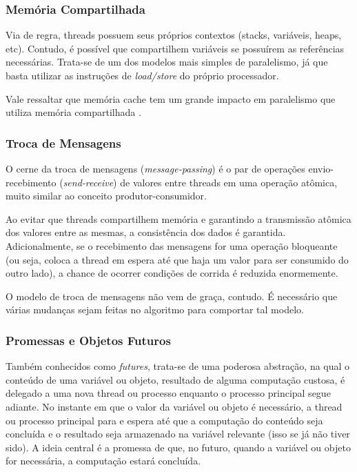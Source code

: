 \documentclass[12pt,a4paper]{article}
\begin{document}
\subsubsection{Memória Compartilhada}
\label{sssec:memoria compartilhada}

Via de regra, threads possuem seus próprios contextos (stacks, variáveis, heaps, etc). Contudo, é possível que compartilhem variáveis se possuírem as referências necessárias. Trata-se de um dos modelos mais simples de paralelismo, já que basta utilizar as instruções de \emph{load/store} do próprio processador.

Vale ressaltar que memória cache tem um grande impacto em paralelismo que utiliza memória compartilhada \cite{pacheco11}.

\subsubsection{Troca de Mensagens}
\label{sssec:troca mensagens}

O cerne da troca de mensagens (\emph{message-passing}) é o par de operações envio-recebimento ({\it send-receive}) de valores entre threads em uma operação atômica, muito similar ao conceito produtor-consumidor.

Ao evitar que threads compartilhem memória e garantindo a transmissão atômica dos valores entre as mesmas, a consistência dos dados é garantida. Adicionalmente, se o recebimento das mensagens for uma operação bloqueante (ou seja, coloca a thread em espera até que haja um valor para ser consumido do outro lado), a chance de ocorrer condições de corrida é reduzida enormemente.

O modelo de troca de mensagens não vem de graça, contudo. É necessário que várias mudanças sejam feitas no algoritmo para comportar tal modelo.

\subsubsection{Promessas e Objetos Futuros}
\label{sssec:promessas objetos futuros}

Também conhecidos como {\it futures}, trata-se de uma poderosa abstração, na qual o conteúdo de uma variável ou objeto, resultado de alguma computação custosa, é delegado a uma nova thread ou processo enquanto o processo principal segue adiante. No instante em que o valor da variável ou objeto é necessário, a thread ou processo principal para e espera até que a computação do conteúdo seja concluída e o resultado seja armazenado na variável relevante (isso se já não tiver sido). A ideia central é a promessa de que, no futuro, quando a variável ou objeto for necessária, a computação estará concluída.
\end{document}
